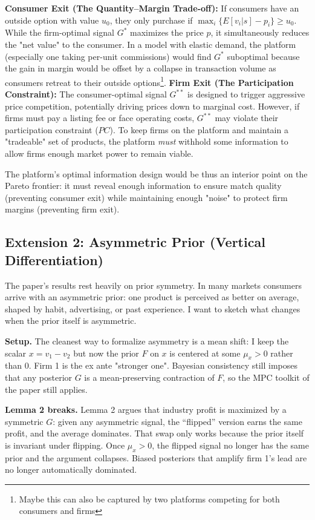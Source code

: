 \documentclass[12pt, a4paper]{article}
\begin{document}
    \textbf{Consumer Exit (The Quantity--Margin Trade-off):} If consumers have an outside option with value $u_0$, they only purchase if $\max_i \{E[v_i|s] - p_i\} \geq u_0$. While the firm-optimal signal $G^*$ maximizes the price $p$, it simultaneously reduces the "net value" to the consumer. In a model with elastic demand, the platform (especially one taking per-unit commissions) would find $G^*$ suboptimal because the gain in margin would be offset by a collapse in transaction volume as consumers retreat to their outside options\footnote{Maybe this can also be captured by two platforms competing for both consumers and firms}.
    \textbf{Firm Exit (The Participation Constraint):} The consumer-optimal signal $G^{**}$ is designed to trigger aggressive price competition, potentially driving prices down to marginal cost. However, if firms must pay a listing fee or face operating costs, $G^{**}$ may violate their participation constraint ($PC$). To keep firms on the platform and maintain a "tradeable" set of products, the platform \textit{must} withhold some information to allow firms enough market power to remain viable.

The platform's optimal information design would be thus an interior point on the Pareto frontier: it must reveal enough information to ensure match quality (preventing consumer exit) while maintaining enough "noise" to protect firm margins (preventing firm exit). 
 
\subsection{Extension 2: Asymmetric Prior (Vertical Differentiation)}

The paper's results rest heavily on prior symmetry. In many markets consumers arrive with an asymmetric prior: one product is perceived as better on average, shaped by habit, advertising, or past experience. I want to sketch what changes when the prior itself is asymmetric.

\textbf{Setup.} The cleanest way to formalize asymmetry is a mean shift: I keep the scalar $x = v_1 - v_2$ but now the prior $F$ on $x$ is centered at some $\mu_x > 0$ rather than $0$. Firm 1 is the ex ante "stronger one". Bayesian consistency still imposes that any posterior $G$ is a mean-preserving contraction of $F$, so the MPC toolkit of the paper still applies.

\textbf{Lemma 2 breaks.} Lemma 2 argues that industry profit is maximized by a symmetric $G$: given any asymmetric signal, the ``flipped'' version earns the same profit, and the average dominates. That swap only works because the prior itself is invariant under flipping. Once $\mu_x > 0$, the flipped signal no longer has the same prior and the argument collapses. Biased posteriors that amplify firm 1's lead are no longer automatically dominated.
\end{document}
